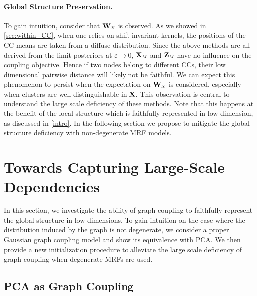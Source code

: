 \paragraph{Global Structure Preservation. }
To gain intuition, consider that $\Wb_{\scaleto{X}{4pt}}$ is observed. As we showed in \cref{sec:within_CC}, when one relies on shift-invariant kernels, the positions of the CC means are taken from a diffuse distribution. Since the above methods are all derived from the limit posteriors at $\varepsilon \to 0$, $\Xb_{\scaleto{M}{4pt}}$ and $\Zb_{\scaleto{M}{4pt}}$ have no influence on the coupling objective. Hence if two nodes belong to different CCs, their low dimensional pairwise distance will likely not be faithful. We can expect this phenomenon to persist when the expectation on $\Wb_{\scaleto{X}{4pt}}$ is considered, especially when clusters are well distinguishable in $\mathbf{X}$. This observation is central to understand the large scale deficiency of these methods. Note that this happens at the benefit of the local structure which is faithfully represented in low dimension, as discussed in \cref{intro}. In the following section we propose to mitigate the global structure deficiency with non-degenerate MRF models.

\section{Towards Capturing Large-Scale Dependencies}\label{sec:towards_large_scale}

In this section, we investigate the ability of graph coupling to faithfully represent the global structure in low dimensions. To gain intuition on the case where the distribution induced by the graph is not degenerate, we consider a proper Gaussian graph coupling model and show its equivalence with PCA. We then provide a new initialization procedure to alleviate the large scale deficiency of graph coupling when degenerate MRFs are used.

\subsection{PCA as Graph Coupling}

